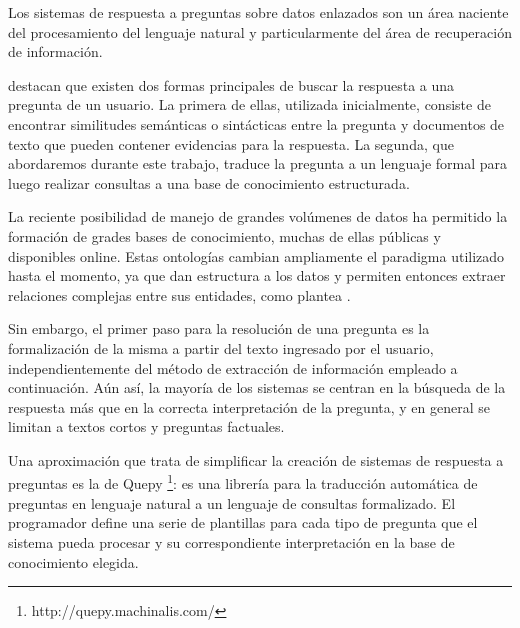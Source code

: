 
Los sistemas de respuesta a preguntas sobre datos enlazados son un área naciente del procesamiento del lenguaje natural y particularmente del área de recuperación de información.

\citet{gupta_survey} destacan que existen dos formas principales de buscar la respuesta a una pregunta de un usuario. La primera de ellas, utilizada inicialmente, consiste de encontrar similitudes semánticas o sintácticas entre la pregunta y documentos de texto que pueden contener evidencias para la respuesta. La segunda, que abordaremos durante este trabajo, traduce la pregunta a un lenguaje formal para luego realizar consultas a una base de conocimiento estructurada.

La reciente posibilidad de manejo de grandes volúmenes de datos ha permitido la formación de grades bases de conocimiento, muchas de ellas públicas y disponibles online. Estas ontologías cambian ampliamente el paradigma utilizado hasta el momento, ya que dan estructura a los datos y permiten entonces extraer relaciones complejas entre sus entidades, como plantea \citet{ou_entailement}.

Sin embargo, el primer paso para la resolución de una pregunta es la formalización de la misma a partir del texto ingresado por el usuario, independientemente del método de extracción de información empleado a continuación. Aún así, la mayoría de los sistemas se centran en la búsqueda de la respuesta más que en la correcta interpretación de la pregunta, y en general se limitan a textos cortos y preguntas factuales.

Una aproximación que trata de simplificar la creación de sistemas de respuesta a preguntas es la de Quepy \footnote{http://quepy.machinalis.com/}: es una librería para la traducción automática de preguntas en lenguaje natural a un lenguaje de consultas formalizado. El programador define una serie de plantillas para cada tipo de pregunta que el sistema pueda procesar y su correspondiente interpretación en la base de conocimiento elegida.


